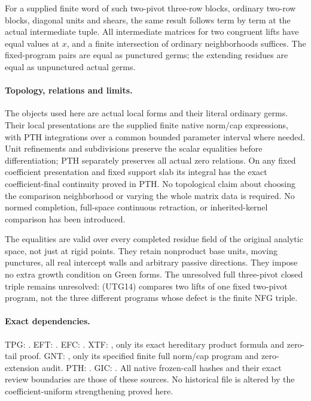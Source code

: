 For a supplied finite word of such two-pivot three-row blocks,
ordinary two-row blocks, diagonal units and shears, the same
result follows term by term at the actual intermediate tuple.
All intermediate matrices for two congruent lifts have equal
values at $x$, and a finite intersection of ordinary neighborhoods
suffices.  The fixed-program pairs are equal as punctured germs;
the extending residues are equal as unpunctured actual germs.

\paragraph{Topology, relations and limits.}
The objects used here are actual local forms and their literal
ordinary germs.  Their local presentations are the supplied finite
native norm/cap expressions, with PTH integrations over a common
bounded parameter interval where needed.  Unit refinements and
subdivisions preserve the scalar equalities before differentiation;
PTH separately preserves all actual zero relations.  On any fixed
coefficient presentation and fixed support slab its integral has
the exact coefficient-final continuity proved in PTH.  No
topological claim about choosing the comparison neighborhood or
varying the whole matrix data is required.  No normed completion,
full-space continuous retraction, or inherited-kernel comparison
has been introduced.

The equalities are valid over every completed residue field of
the original analytic space, not just at rigid points.  They
retain nonproduct base units, moving punctures, all real intercept
walls and arbitrary passive directions.  They impose no extra
growth condition on Green forms.  The unresolved full three-pivot
closed triple remains unresolved: (UTG14) compares two lifts of
one fixed two-pivot program, not the three different programs
whose defect is the finite NFG triple.

\paragraph{Exact dependencies.}
TPG: .
EFT: .
EFC: .
XTF: ,
only its exact hereditary product formula and zero-tail proof.
GNT: ,
only its specified finite full norm/cap program and zero-extension audit.
PTH: .
GIC: .
All native frozen-call hashes and their exact review boundaries are
those of these sources.  No historical file is altered by the
coefficient-uniform strengthening proved here.
